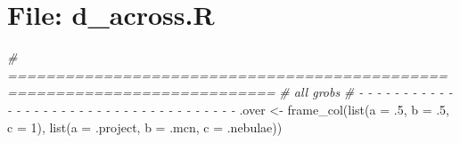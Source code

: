 \documentclass[
]{article}
\newenvironment{Shaded}{\begin{snugshade}}{\end{snugshade}}
\newcommand{\AttributeTok}[1]{\textcolor[rgb]{0.77,0.63,0.00}{#1}}
\newcommand{\CommentTok}[1]{\textcolor[rgb]{0.56,0.35,0.01}{\textit{#1}}}
\newcommand{\DecValTok}[1]{\textcolor[rgb]{0.00,0.00,0.81}{#1}}
\newcommand{\DocumentationTok}[1]{\textcolor[rgb]{0.56,0.35,0.01}{\textbf{\textit{#1}}}}
\newcommand{\FunctionTok}[1]{\textcolor[rgb]{0.00,0.00,0.00}{#1}}
\newcommand{\NormalTok}[1]{#1}
\newcommand{\OtherTok}[1]{\textcolor[rgb]{0.56,0.35,0.01}{#1}}
\newcommand{\SpecialCharTok}[1]{\textcolor[rgb]{0.00,0.00,0.00}{#1}}
\begin{document}
\begin{Shaded}
\end{Shaded}

\hypertarget{file-d_across.r}{%
\section{File: d\_across.R}\label{file-d_across.r}}

\begin{Shaded}
\begin{Highlighting}[]
\CommentTok{\# ==========================================================================}
\CommentTok{\# all grobs}
\CommentTok{\# {-} {-} {-} {-} {-} {-} {-} {-} {-} {-} {-} {-} {-} {-} {-} {-} {-} {-} {-} {-} {-} {-} {-} {-} {-} {-} {-} {-} {-} {-} {-} {-} {-} {-} {-} {-} {-}}
\NormalTok{.over }\OtherTok{\textless{}{-}} \FunctionTok{frame\_col}\NormalTok{(}\FunctionTok{list}\NormalTok{(}\AttributeTok{a =}\NormalTok{ .}\DecValTok{5}\NormalTok{, }\AttributeTok{b =}\NormalTok{ .}\DecValTok{5}\NormalTok{, }\AttributeTok{c =} \DecValTok{1}\NormalTok{),}
                   \FunctionTok{list}\NormalTok{(}\AttributeTok{a =}\NormalTok{ .project, }\AttributeTok{b =}\NormalTok{ .mcn, }\AttributeTok{c =}\NormalTok{ .nebulae))}
\end{Highlighting}
\end{Shaded}
\end{document}
